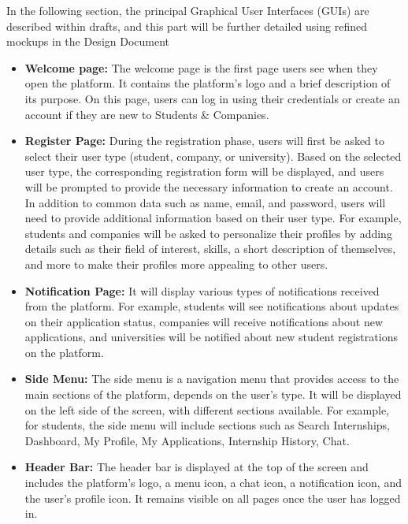In the following section, the principal Graphical User Interfaces (GUIs) are described within drafts, and this part will be further detailed
using refined mockups in the Design Document
\begin{itemize}
    \item \textbf{Welcome page:} The welcome page is the first page users see when they open the platform. It contains the platform's logo 
    and a brief description of its purpose. On this page, users can log in using their credentials or create an account if they are new
    to Students \& Companies.
    
    \item \textbf{Register Page:} During the registration phase, users will first be asked to select their user type (student, company, or
     university). Based on the selected user type, the corresponding registration form will be displayed, and users will be prompted to 
     provide the necessary information to create an account. In addition to common data such as name, email, and password, users will
     need to provide additional information based on their user type. For example, students and companies will be asked to personalize 
     their profiles by adding details such as their field of interest, skills, a short description of themselves, and more to make their
      profiles more appealing to other users.
    
    \item \textbf{Notification Page:} It will display various types of notifications received from the platform. For example, students will
    see notifications about updates on their application status, companies will receive notifications about new applications, and 
    universities will be notified about new student registrations on the platform.

    \item \textbf{Side Menu:} The side menu is a navigation menu that provides access to the main sections of the platform, depends on the
    user's type. It will be displayed on the left side of the screen, with different sections available. For example, for students, the 
    side menu will include sections such as Search Internships, Dashboard, My Profile, My Applications, Internship History, Chat.

    \item \textbf{Header Bar:} The header bar is displayed at the top of the screen and includes the platform's logo, a menu icon, a chat 
    icon, a notification icon, and the user's profile icon. It remains visible on all pages once the user has logged in.


\end{itemize}
